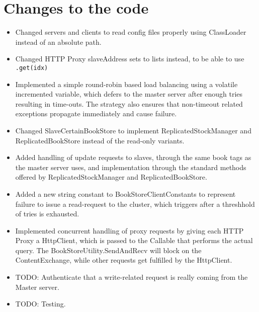 \section{Changes to the code}
\begin{itemize}
    \item Changed servers and clients to read config files properly using
        ClassLoader instead of an absolute path.
    \item Changed HTTP Proxy slaveAddress sets to lists instead, to be able to
        use \texttt{.get(idx)}
    \item Implemented a simple round-robin based load balancing using a volatile
        incremented variable, which defers to the master server after enough
        tries resulting in time-outs. The strategy also ensures that non-timeout
        related exceptions propagate immediately and cause failure.
    \item Changed SlaveCertainBookStore to implement ReplicatedStockManager and
        ReplicatedBookStore instead of the read-only variants.
    \item Added handling of update requests to slaves, through the same book
        tags as the master server uses, and implementation through the standard
        methods offered by ReplicatedStockManager and ReplicatedBookStore.
    \item Added a new string constant to BookStoreClientConstants to represent
        failure to issue a read-request to the cluster, which triggers after a
        threshhold of tries is exhausted.
    \item Implemented concurrent handling of proxy requests by giving each HTTP
        Proxy a HttpClient, which is passed to the Callable that performs the
        actual query. The BookStoreUtility.SendAndRecv will block on the
        ContentExchange, while other requests get fulfilled by the HttpClient.
    \item TODO: Authenticate that a write-related request is really coming from
        the Master server.
    \item TODO: Testing.
\end{itemize}
